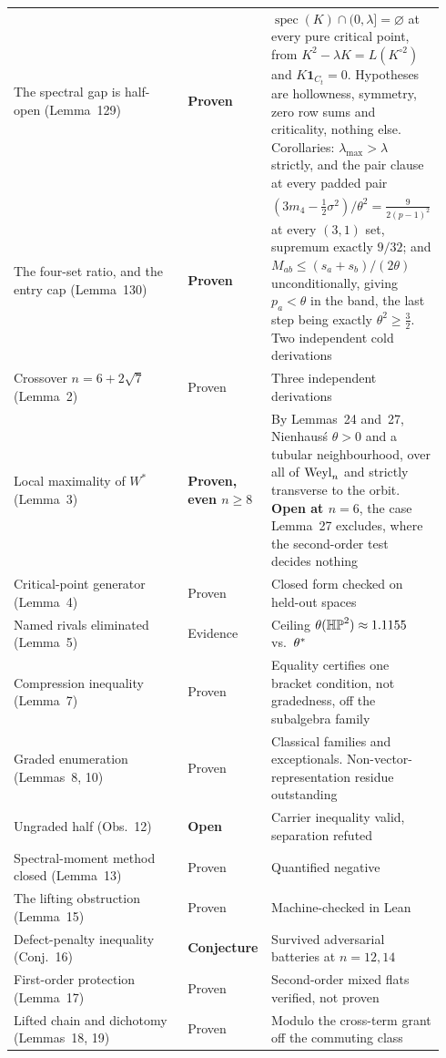 \begin{longtable}{@{}p{0.40\linewidth}p{0.16\linewidth}p{0.38\linewidth}@{}}
The spectral gap is half-open (Lemma~129) & \textbf{Proven} & $\operatorname{spec}(K)\cap(0,\lambda]=\varnothing$ at every pure critical point, from $K^2-\lambda K=L(K^{\circ2})$ and $K\mathbf1_{C_t}=0$. Hypotheses are hollowness, symmetry, zero row sums and criticality, nothing else. Corollaries: $\lambda_{\max}>\lambda$ strictly, and the pair clause at every padded pair \\
The four-set ratio, and the entry cap (Lemma~130) & \textbf{Proven} & $(3m_4-\tfrac12\sigma^2)/\theta^2=\tfrac9{2(p-1)^2}$ at every $(3,1)$ set, supremum exactly $9/32$; and $M_{ab}\le(s_a+s_b)/(2\theta)$ unconditionally, giving $p_a<\theta$ in the band, the last step being exactly $\theta^2\ge\tfrac32$. Two independent cold derivations \\
Crossover $n=6+2\sqrt7$ (Lemma~2) & Proven & Three independent derivations \\
Local maximality of $W^{*}$ (Lemma~3) & \textbf{Proven, even $n\ge8$} & By Lemmas~24 and~27, Nienhaus\'s $\theta>0$ and a tubular neighbourhood, over all of $\mathrm{Weyl}_n$ and strictly transverse to the orbit. \textbf{Open at $n=6$}, the case Lemma~27 excludes, where the second-order test decides nothing \\
Critical-point generator (Lemma~4) & Proven & Closed form checked on held-out spaces \\
Named rivals eliminated (Lemma~5) & Evidence & Ceiling $\theta(\mathbb{HP}^2)\approx1.1155$ vs.\ $\theta^{*}$ \\
Compression inequality (Lemma~7) & Proven & Equality certifies one bracket condition, not gradedness, off the subalgebra family \\
Graded enumeration (Lemmas~8, 10) & Proven & Classical families and exceptionals. Non-vector-representation residue outstanding \\
Ungraded half (Obs.~12) & \textbf{Open} & Carrier inequality valid, separation refuted \\
Spectral-moment method closed (Lemma~13) & Proven & Quantified negative \\
The lifting obstruction (Lemma~15) & Proven & Machine-checked in Lean \\
Defect-penalty inequality (Conj.~16) & \textbf{Conjecture} & Survived adversarial batteries at $n=12,14$ \\
First-order protection (Lemma~17) & Proven & Second-order mixed flats verified, not proven \\
Lifted chain and dichotomy (Lemmas~18, 19) & Proven & Modulo the cross-term grant off the commuting class \\

\end{longtable}
